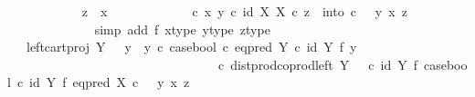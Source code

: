 \begin{isabellebody}
\ \ \ \ \ \ \ \ \ \ \isamarkupfalse%
\ {\isachardoublequoteopen}z\ {\isasymnoteq}\ x{\isachardoublequoteclose}\isanewline
\ \ \ \ \ \ \ \ \ \ \isamarkupfalse%
\ {\isachardoublequoteopen}{\isacharparenleft}{\kern0pt}{\isasymTheta}\ {\isasymcirc}\isactrlsub c\ {\isasymlangle}x{\isacharcomma}{\kern0pt}\ y{}{\isasymrangle}{\isacharparenright}{\kern0pt}\isactrlsup {\isasymflat}\ {\isasymcirc}\isactrlsub c\ {\isasymlangle}id\ X{\isacharcomma}{\kern0pt}\ {\isasymbeta}\isactrlbsub X\isactrlesub {\isasymrangle}\ {\isasymcirc}\isactrlsub c\ z\ {\isacharequal}{\kern0pt}\ into\ {\isasymcirc}\isactrlsub c\ \ \ {\isasymlangle}y{}{\isacharcomma}{\kern0pt}\ {\isasymlangle}x{\isacharcomma}{\kern0pt}\ z{\isasymrangle}{\isasymrangle}{\isachardoublequoteclose}\isanewline
\ \ \ \ \ \ \ \ \ \ \ \ \isamarkupfalse%
\ {\isacharparenleft}{\kern0pt}simp\ add{\isacharcolon}{\kern0pt}\ f{}\ x{\isacharunderscore}{\kern0pt}type\ y{}{\isacharunderscore}{\kern0pt}type\ z{\isacharunderscore}{\kern0pt}type{\isacharparenright}{\kern0pt}\isanewline
\ \ \ \ \ \ \ \ \ \ \isamarkupfalse%
\ \isamarkupfalse%
\ {\isachardoublequoteopen}{\isachardot}{\kern0pt}{\isachardot}{\kern0pt}{\isachardot}{\kern0pt}\ {\isacharequal}{\kern0pt}\ {\isacharparenleft}{\kern0pt}left{\isacharunderscore}{\kern0pt}cart{\isacharunderscore}{\kern0pt}proj\ Y\ {\isasymone}\ {\isasymamalg}\ {\isacharparenleft}{\kern0pt}{\isacharparenleft}{\kern0pt}y{}\ {\isasymamalg}\ y{}{\isacharparenright}{\kern0pt}\ {\isasymcirc}\isactrlsub c\ case{\isacharunderscore}{\kern0pt}bool\ {\isasymcirc}\isactrlsub c\ eq{\isacharunderscore}{\kern0pt}pred\ Y\ {\isasymcirc}\isactrlsub c\ {\isacharparenleft}{\kern0pt}id\ Y\ {\isasymtimes}\isactrlsub f\ y{}{\isacharparenright}{\kern0pt}{\isacharparenright}{\kern0pt}{\isacharparenright}{\kern0pt}\isanewline
\ \ \ \ \ \ \ \ \ \ \ \ \ \ \ \ \ \ \ \ \ \ \ \ \ \ \ \ \ \ \ \ \ {\isasymcirc}\isactrlsub c\ dist{\isacharunderscore}{\kern0pt}prod{\isacharunderscore}{\kern0pt}coprod{\isacharunderscore}{\kern0pt}left\ Y\ {\isasymone}\ {\isasymone}\ {\isasymcirc}\isactrlsub c\ {\isacharparenleft}{\kern0pt}id\ Y\ {\isasymtimes}\isactrlsub f\ case{\isacharunderscore}{\kern0pt}bool{\isacharparenright}{\kern0pt}\ {\isasymcirc}\isactrlsub c\ {\isacharparenleft}{\kern0pt}id\ Y\ {\isasymtimes}\isactrlsub f\ eq{\isacharunderscore}{\kern0pt}pred\ X{\isacharparenright}{\kern0pt}\ {\isasymcirc}\isactrlsub c\ \ \ {\isasymlangle}y{}{\isacharcomma}{\kern0pt}\ {\isasymlangle}x{\isacharcomma}{\kern0pt}\ z{\isasymrangle}{\isasymrangle}{\isachardoublequoteclose}\isanewline

\end{isabellebody}
